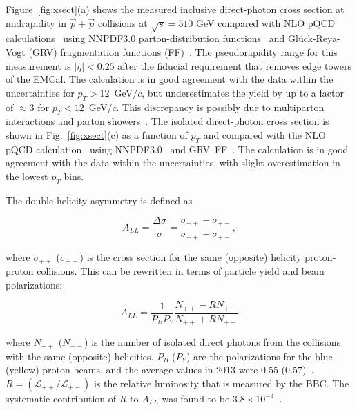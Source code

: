 \documentclass[twocolumn,letterpaper,aps,prl,longbibliography,superscriptaddress,floatfix]{revtex4-2}
\newcommand{\pT}{\mbox{$p_T$}\xspace}
\begin{document}
Figure~\ref{fig:xsect}(a) shows the measured inclusive direct-photon 
cross section at midrapidity in $\vec{p}+\vec{p}$ collisions at 
$\sqrt{s}=510$ GeV compared with NLO pQCD 
calculations~\cite{PhysRevD.48.3136,PhysRevD.50.1901} using NNPDF3.0 
parton-distribution functions~\cite{Ball2015,Bonvini2015} and 
Gl{\"u}ck-Reya-Vogt (GRV) fragmentation functions 
(FF)~\cite{PhysRevD.45.3986}. The pseudorapidity range for this 
measurement is $|\eta|<0.25$ after the fiducial requirement that removes 
edge towers of the EMCal. The calculation is in good agreement with the 
data within the uncertainties for $p_T>12$~GeV/$c$, but underestimates 
the yield by up to a factor of $\approx$3 for \mbox{$p_T<12$ GeV/$c$}. 
This discrepancy is possibly due to multiparton interactions and parton 
showers~\cite{Nason_2004,Frixione_2007,Alioli2010,Jezo2016,Klasen2018}. 
The isolated direct-photon cross section is shown in 
Fig.~\ref{fig:xsect}(c) as a function of \pT and compared with the NLO 
pQCD calculation~\cite{PhysRevD.48.3136,PhysRevD.50.1901} using 
NNPDF3.0~\cite{Ball2015,Bonvini2015} and 
GRV~FF~\cite{PhysRevD.45.3986}. The calculation is in good agreement with 
the data within the uncertainties, with slight overestimation in the 
lowest \pT bins.


The double-helicity asymmetry is defined as

\begin{equation} \label{eq:all}
A_{LL} = \frac{\Delta\sigma}{\sigma} = \frac{\sigma_{++}-\sigma_{+-}}{\sigma_{++}+\sigma_{+-}},
\end{equation}

\noindent where $\sigma_{++}$ ($\sigma_{+-}$) is the cross section for the same 
(opposite) helicity proton-proton collisions. This can be rewritten in 
terms of particle yield and beam polarizations:

\begin{equation}
A_{LL} = \frac{1}{P_BP_Y} \frac{N_{++}-RN_{+-}}{N_{++}+RN_{+-}}
\end{equation}

\noindent where $N_{++}$ ($N_{+-}$) is the number of isolated direct photons from 
the collisions with the same (opposite) helicities. $P_{B}$ ($P_{Y}$) 
are the polarizations for the blue (yellow) proton beams, and the 
average values in 2013 were 0.55 (0.57)~\cite{POBLAGUEV2020164261}. $R 
=(\mathcal{L_{++}}/\mathcal{L_{+-}})$ is the relative luminosity that is 
measured by the BBC. The systematic contribution of $R$ to $A_{LL}$ was 
found to be $3.8{\times}10^{-4}$~\cite{PhysRevD.93.011501}.
\end{document}

